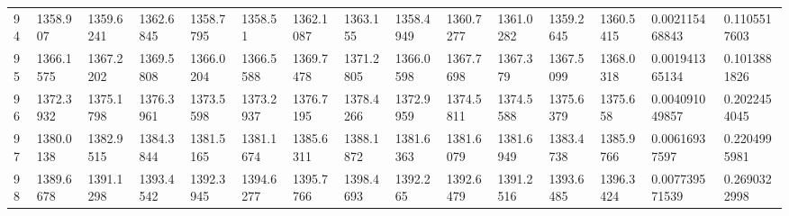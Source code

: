 \begin{landscape}
{\begin{longtable}{@{}lllllllllllllll@{}}
		94                                           & 1358.907                 & 1359.6241                & 1362.6845                & 1358.7795                & 1358.51                  & 1362.1087                & 1363.155                 & 1358.4949                & 1360.7277                & 1361.0282                & 1359.2645                & 1360.5415                & 0.002115468843                                                         & 0.1105517603                                    \\
		95                                           & 1366.1575                & 1367.2202                & 1369.5808                & 1366.0204                & 1366.5588                & 1369.7478                & 1371.2805                & 1366.0598                & 1367.7698                & 1367.379                 & 1367.5099                & 1368.0318                & 0.001941365134                                                         & 0.1013881826                                    \\
		96                                           & 1372.3932                & 1375.1798                & 1376.3961                & 1373.5598                & 1373.2937                & 1376.7195                & 1378.4266                & 1372.9959                & 1374.5811                & 1374.5588                & 1375.6379                & 1375.658                 & 0.004091049857                                                         & 0.2022454045                                    \\
		97                                           & 1380.0138                & 1382.9515                & 1384.3844                & 1381.5165                & 1381.1674                & 1385.6311                & 1388.1872                & 1381.6363                & 1381.6079                & 1381.6949                & 1383.4738                & 1385.9766                & 0.00616937597                                                          & 0.2204995981                                    \\
		98                                           & 1389.6678                & 1391.1298                & 1393.4542                & 1392.3945                & 1394.6277                & 1395.7766                & 1398.4693                & 1392.265                 & 1392.6479                & 1391.2516                & 1393.6485                & 1396.3424                & 0.007739571539                                                         & 0.2690322998                                    \\

\end{longtable}}
\end{landscape}
